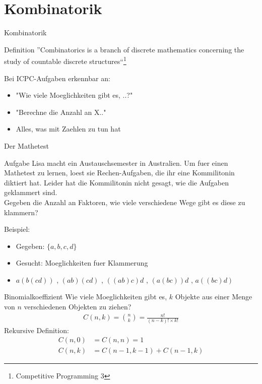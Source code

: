 \documentclass[18pt]{beamer}
\begin{document}
\section{Kombinatorik}
\begin{frame}{Kombinatorik}
\begin{block}{Definition}
''Combinatorics is a branch of discrete mathematics concerning the study of countable discrete structures``\footnote{Competitive Programming 3}
\end{block}
\pause
Bei ICPC-Aufgaben erkennbar an:
\begin{itemize}
\item "Wie viele Moeglichkeiten gibt es, ..?"
\item "Berechne die Anzahl an X.."
\item Alles, was mit Zaehlen zu tun hat
\end{itemize}
\end{frame}

\begin{frame}{Der Mathetest}
\begin{block}{Aufgabe}
Lisa macht ein Austauschsemester in Australien. Um fuer einen Mathetest zu lernen, loest sie Rechen-Aufgaben, die ihr eine Kommilitonin diktiert hat. Leider hat die Kommilitonin nicht gesagt, wie die Aufgaben geklammert sind. \\
Gegeben die Anzahl an Faktoren, wie viele verschiedene Wege gibt es diese zu klammern?
\end{block}
\pause
Beispiel:
\begin{itemize}
\item Gegeben: $\lbrace a, b, c, d \rbrace$
\item Gesucht: Moeglichkeiten fuer Klammerung
\item $ a \left( b \left( c d \right) \right) $ , $\left( a b \right) \left( c d \right) $ , $\left( \left( a b \right) c \right) d$ , $\left( a \left( b  c \right) \right) d $ , $ a \left( \left( b  c \right) d \right) $
\end{itemize}
\end{frame}

\begin{frame}{Binomialkoeffizient}
Wie viele Moeglichkeiten gibt es, $k$ Objekte aus einer Menge von $n$ verschiedenen Objekten zu ziehen?
\pause
\begin{align*}
C\left( n,k \right) = \binom{n}{k} = \frac{n!}{\left( n-k \right) ! \times k!}
\end{align*}
\pause
Rekursive Definition:
\begin{align*}
C\left( n, 0 \right) &= C\left( n,n \right) = 1 \\
C\left( n,k \right) &= C\left( n-1,k-1 \right) + C\left( n-1,k \right)
\end{align*} %

\end{frame}
\end{document}
